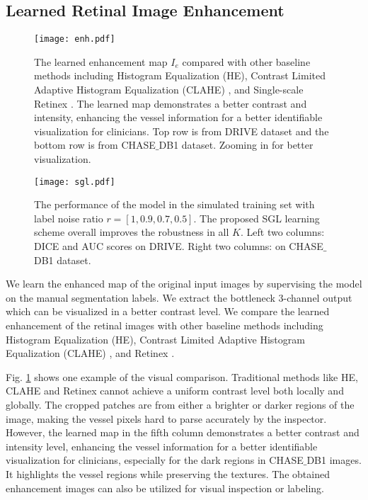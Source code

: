 \documentclass[runningheads]{llncs}
\begin{document}
\subsection{Learned Retinal Image Enhancement}
\begin{figure}[t]\centering
\texttt{[image: enh.pdf]}
\caption{The learned enhancement map $I_e$ compared with other baseline methods including Histogram Equalization (HE), Contrast Limited Adaptive Histogram Equalization (CLAHE) 
\cite{pizer1987adaptive}, and Single-scale Retinex \cite{zhao2015retinal}. The learned map demonstrates a better contrast and intensity, enhancing the vessel information for a better identifiable visualization for clinicians. Top row is from DRIVE dataset and the bottom row is from CHASE$\_$DB1 dataset. Zooming in for better visualization. }
  \label{fig:enh}
\end{figure}

\begin{figure}[t]\setlength{\abovecaptionskip}{0pt}
\centering
\texttt{[image: sgl.pdf]}
\caption{The performance of the model in the simulated training set with label noise ratio $r=[1, 0.9, 0.7, 0.5]$. The proposed SGL learning scheme overall improves the robustness in all $K$. Left two columns: DICE and AUC scores on DRIVE. Right two columns: on CHASE$\_$DB1 dataset.}
\label{fig:drive}
\end{figure}
We learn the enhanced map of the original input images by supervising the model on the manual segmentation labels. We extract the bottleneck 3-channel output which can be visualized in a better contrast level. We compare the learned enhancement of the retinal images with other baseline methods including Histogram Equalization (HE), Contrast Limited Adaptive Histogram Equalization (CLAHE) \cite{pizer1987adaptive}, and Retinex \cite{zhao2015retinal}. 

Fig. \ref{fig:enh} shows one example of the visual comparison. Traditional methods like HE, CLAHE and Retinex cannot achieve a uniform contrast level both locally and globally. The cropped patches are from either a brighter or darker regions of the image, making the vessel pixels hard to parse accurately by the inspector. However, the learned map in the fifth column demonstrates a better contrast and intensity level, enhancing the vessel information for a better identifiable visualization for clinicians, especially for the dark regions in CHASE$\_$DB1 images. It highlights the vessel regions while preserving the textures. The obtained enhancement images can also be utilized for visual inspection or labeling.
\end{document}
